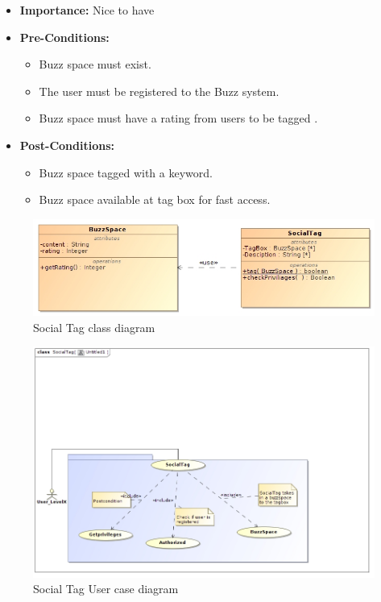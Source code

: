 \documentclass[11pt]{article}
\begin{document}
\begin{enumerate}
\begin{itemize}
\item \textbf{Importance:} Nice to have
\item \textbf{Pre-Conditions: }
	\begin{itemize}
		\item Buzz space must exist.
		\item The user must be registered to the Buzz system.
		\item Buzz space must have a rating from users to be tagged .
	\end{itemize}

\item \textbf{Post-Conditions: }
	\begin{itemize}
	\item Buzz space tagged with a keyword.
	\item Buzz space available at tag box for fast access.
	\end{itemize}
\end{itemize}

\begin{figure}[H]	
\graphicspath{ {../Diagrams/sfiso/} }
    	\includegraphics[scale=0.5]{socialC.jpg}
    	\caption{Social Tag class  diagram}
	\end{figure}
	\begin{figure}[H]	
\graphicspath{ {../Diagrams/sfiso/} }
    	\includegraphics[scale=0.5]{socialtag.jpg}
    	\caption{Social Tag User case diagram}
	\end{figure}


\end{enumerate}
\end{document}
